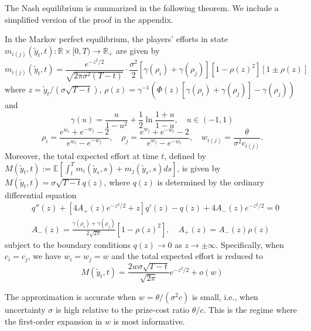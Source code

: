 \documentclass[mnsc]{informs3}
\begin{document}
The Nash equilibrium is summarized in the following theorem.
We include a simplified version of the proof in the appendix.

\begin{theorem}
In the Markov perfect equilibrium, the players’ efforts in state $m_{i(j)}(\tilde{y}_t, t) :\mathbb{R}\times[0, T)\to\mathbb{R}_+$ are given by
\begin{equation}\label{eq-equilibrium-effort}
m_{i(j)}(\tilde{y}_t, t) = \frac{e^{-z^2/2}}{\sqrt{2\pi\sigma^2(T-t)}}\cdot \frac{\sigma^2}{2}\left[\gamma(\rho_{i}) + \gamma(\rho_{j})\right]\left[1-\rho(z)^2\right]\left[1 \pm \rho(z)\right]
\end{equation}
where $z = \tilde{y}_t / (\sigma\sqrt{T-t})$, $\rho(z) = \gamma^{-1}\left(\Phi(z)\left[\gamma(\rho_{i})+\gamma(\rho_{j})\right]-\gamma(\rho_{j})\right)$ and
\begin{equation}\label{eq-gamma}
\gamma(u) = \frac{u}{1-u^2} + \frac{1}{2}\ln\frac{1+u}{1-u},\quad u\in(-1,1)
\end{equation}
\begin{equation*}
\rho_{i} = \frac{e^{w_{i}}+e^{-w_{j}}-2}{e^{w_{i}}-e^{-w_{j}}},
\quad
\rho_{j} = \frac{e^{w_{j}}+e^{-w_{i}}-2}{e^{w_{j}}-e^{-w_{i}}},
\quad
w_{i(j)} = \frac{\theta}{\sigma^2 c_{i(j)}}.
\end{equation*}
Moreover, the total expected effort at time $t$, defined by $M(\tilde{y}_t, t) := \mathbb{E}\left[\int^T_t m_i(\tilde{y}_s, s) + m_j(\tilde{y}_s, s)ds\right]$, is given by $M(\tilde{y}_t, t) = \sigma \sqrt{T-t} q(z)$, where $q(z)$ is determined by the ordinary differential equation
\begin{equation}
\begin{aligned}
&q''(z) + \left[4A_+(z)e^{-z^2/2}+z\right]q'(z) - q(z) + 4A_-(z)e^{-z^2/2} = 0\\
&A_-(z) = \frac{\gamma(\rho_i) + \gamma(\rho_j)}{2\sqrt{2\pi}}[1 - \rho(z)^2],
\quad A_+(z) = A_-(z)\rho(z)
\end{aligned}
\end{equation}
subject to the boundary conditions $q(z)\to0$ as $z\to\pm\infty$.
Specifically, when $c_i = c_j$, we have $w_i = w_j = w$ and the total expected effort is reduced to
\begin{equation}\label{eq-totaleffort-reduced}
M(\tilde{y}_t, t) = \frac{2w\sigma\sqrt{T-t}}{\sqrt{2\pi}}e^{-z^2/2} + o(w)
\end{equation}
\end{theorem}

\begin{remark}
The approximation is accurate when $w=\theta/(\sigma^2 c)$ is small, i.e., when uncertainty $\sigma$ is high relative to the prize-cost ratio $\theta/c$. This is the regime where the first-order expansion in $w$ is most informative.
\end{remark}
\end{document}

